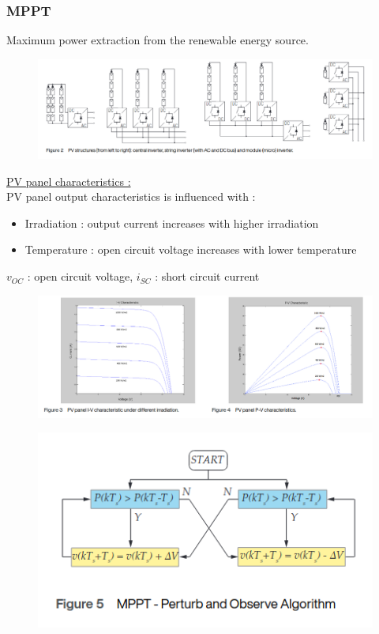\documentclass[../main.tex]{subfiles}
\begin{document}
\subsubsection{MPPT}
Maximum power extraction from the renewable energy source.\\

\begin{figure}[hbt!]
    \centering
    \includegraphics[width=0.8\linewidth]{IMAGES/Indus_el/Screenshot from 2024-11-11 08-41-35.png}
\end{figure}

\quad \underline{PV panel characteristics :}\\
PV panel output characteristics is influenced with : \begin{itemize}
    \item Irradiation : output current increases with higher irradiation
    \item Temperature : open circuit voltage increases with lower temperature
\end{itemize}
$v_{OC}$ : open circuit voltage, $i_{SC}$ : short circuit current\\

\begin{figure}[hbt!]
    \centering
    \includegraphics[width=0.8\linewidth]{IMAGES/Indus_el/Screenshot from 2024-11-11 08-45-37.png}
\end{figure}

\begin{figure}[hbt!]
    \centering
    \includegraphics[width=0.5\linewidth]{IMAGES/Indus_el/Screenshot from 2024-11-11 08-49-55.png}
\end{figure}
\end{document}
